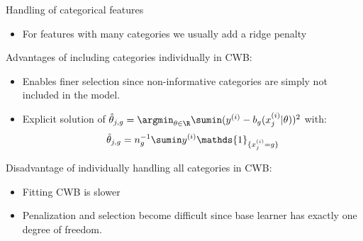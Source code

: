 \documentclass[11pt,compress,t,notes=noshow, xcolor=table]{beamer}
\begin{document}
\begin{vbframe}{Handling of categorical features}
\begin{itemize}
    \item 
        For features with many categories we usually add a ridge penalty
\end{itemize}


\framebreak

Advantages of including categories individually in CWB: 
\begin{itemize}
    \item 
        Enables finer selection since non-informative categories are simply not included in the model. %

    \item 
        Explicit solution of $\thetah_{j,g} = \argmin_{\theta\in\R}\sumin (\yi - b_g(x^{(i)}_j|\theta))^2$ with:
        $$\thetah_{j,g} = n_g^{-1}\sumin \yi \mathds{1}_{\{x^{(i)}_j = g\}}$$
\end{itemize}

Disadvantage of individually handling all categories in CWB:
\begin{itemize}
    \item 
        Fitting CWB is slower 

    \item 
        Penalization and selection become difficult since base learner has exactly one degree of freedom.
\end{itemize}

\end{vbframe}

\end{document}
